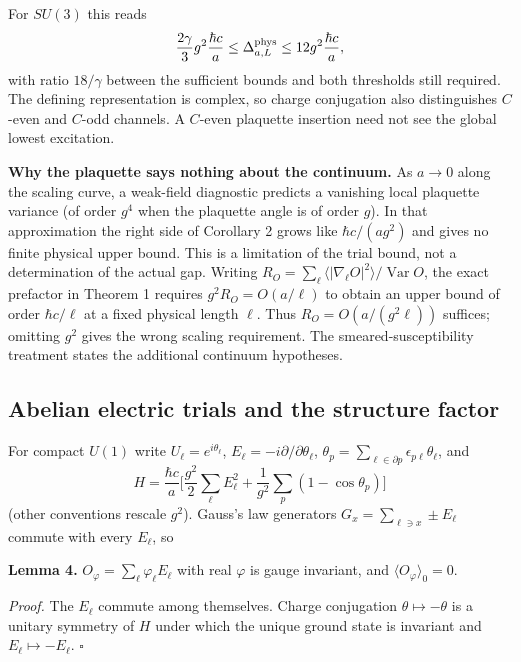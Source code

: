 \documentclass[11pt,a4paper]{article}
\begin{document}
For \(SU(3)\) this reads \[\frac{2\gamma}{3}g^2\frac{\hbar c}{a}\le
\Delta^{\rm phys}_{a,L}\le12g^2\frac{\hbar c}{a},\] with ratio
\(18/\gamma\) between the sufficient bounds and both thresholds still
required. The defining representation is complex, so charge conjugation
also distinguishes \(C\)-even and \(C\)-odd channels. A \(C\)-even
plaquette insertion need not see the global lowest excitation.

\textbf{Why the plaquette says nothing about the continuum.} As
\(a\to0\) along the scaling curve, a weak-field diagnostic predicts a
vanishing local plaquette variance (of order \(g^4\) when the plaquette
angle is of order \(g\)). In that approximation the right side of
Corollary 2 grows like \(\hbar c/(ag^2)\) and gives no finite physical
upper bound. This is a limitation of the trial bound, not a
determination of the actual gap. Writing
\(R_O=\sum_\ell\langle|\nabla_\ell O|^2\rangle/\operatorname{Var}O\),
the exact prefactor in Theorem 1 requires \(g^2R_O=O(a/\ell)\) to obtain
an upper bound of order \(\hbar c/\ell\) at a fixed physical length
\(\ell\). Thus \(R_O=O(a/(g^2\ell))\) suffices; omitting \(g^2\) gives
the wrong scaling requirement. The smeared-susceptibility treatment
states the additional continuum hypotheses.

\hypertarget{abelian-electric-trials-and-the-structure-factor}{%
\subsection{Abelian electric trials and the structure
factor}\label{abelian-electric-trials-and-the-structure-factor}}

For compact \(U(1)\) write \(U_\ell=e^{i\theta_\ell}\),
\(E_\ell=-i\partial/\partial\theta_\ell\),
\(\theta_p=\sum_{\ell\in\partial p}\epsilon_{p\ell}\theta_\ell\), and
\[H=\frac{\hbar c}{a}\Big[\frac{g^2}{2}\sum_\ell E_\ell^2+\frac1{g^2}\sum_p(1-\cos\theta_p)\Big]\]
(other conventions rescale \(g^2\)). Gauss's law generators
\(G_x=\sum_{\ell\ni x}\pm E_\ell\) commute with every \(E_\ell\), so

\textbf{Lemma 4.} \(O_\varphi=\sum_\ell\varphi_\ell E_\ell\) with real
\(\varphi\) is gauge invariant, and \(\langle O_\varphi\rangle_0=0\).

\emph{Proof.} The \(E_\ell\) commute among themselves. Charge
conjugation \(\theta\mapsto-\theta\) is a unitary symmetry of \(H\)
under which the unique ground state is invariant and
\(E_\ell\mapsto-E_\ell\). \(\square\)
\end{document}
